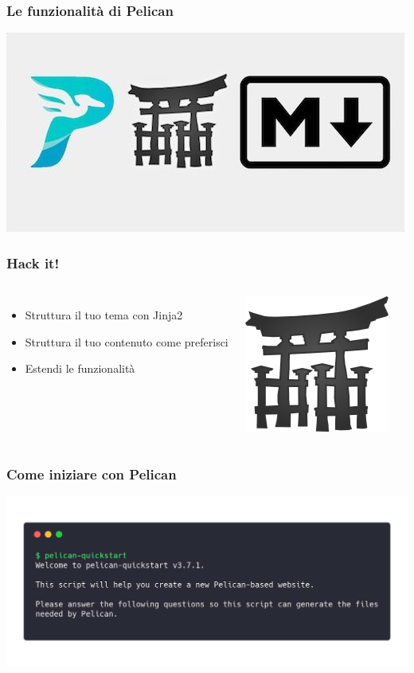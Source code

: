 \begin{frame}
	\frametitle{Le funzionalità di Pelican}
	\begin{center}
		\includegraphics[scale=0.5]{img/pelican_stuff}
	\end{center}
\end{frame}

\begin{frame}
	\frametitle{Hack it!}
	\begin{columns}
		\begin{itemize}
			\item<1-> Struttura il tuo tema con Jinja2
			\item<2-> Struttura il tuo contenuto come preferisci
			\item<3-> Estendi le funzionalità
		\end{itemize}
		\begin{center}
			\includegraphics[scale=1]{img/jinja.png}
		\end{center}
	\end{columns}

\end{frame}

\begin{frame}
	\frametitle{Come iniziare con Pelican}
	\begin{center}
		\includegraphics[scale=0.2]{img/quickstart.png}
	\end{center}
\end{frame}


